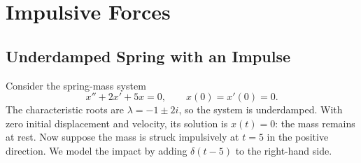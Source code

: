 \documentclass[10pt,letterpaper]{article}
\begin{document}


\section{Impulsive Forces}

\subsection{Underdamped Spring with an Impulse}

Consider the spring-mass system
\[
x''+2x'+5x=0,
\qquad x(0)=x'(0)=0.
\]
The characteristic roots are $\lambda=-1\pm2i$,
so the system is underdamped. With zero initial
displacement and velocity, its solution is $x(t)=0$:
the mass remains at rest.
Now suppose the mass is struck impulsively at $t=5$ in the positive direction.
We model the impact by adding $\delta(t-5)$ to the
right-hand side.
\end{document}
